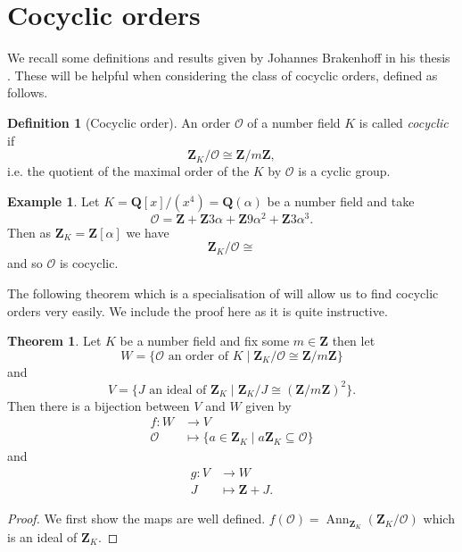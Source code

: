 \documentclass[a4paper,abstracton,bibtotoc]{scrreprt}
\theoremstyle{definition}
\newtheorem{thm}{Theorem}
\newtheorem{defn}{Definition}
\newtheorem{ex}{Example}
\newcommand{\QQ}{\mathbf{Q}}
\newcommand{\ZZ}{\mathbf{Z}}
\renewcommand{\O}{\mathcal{O}}
\DeclareMathOperator{\Ann}{Ann}
\begin{document}



\section{Cocyclic orders}
\label{sec:cocyc}
We recall some definitions and results given by Johannes Brakenhoff in his thesis \cite{brakenhoff}.
These will be helpful when considering the class of cocyclic orders, defined as follows.

\begin{defn}[Cocyclic order]
An order $\O$ of a number field $K$ is called \emph{cocyclic} if
\[
\ZZ_K/\O \cong \ZZ/m\ZZ,
\]
i.e. the quotient of the maximal order of the $K$ by $\O$ is a cyclic group.
\end{defn}

\begin{ex}
\label{ex:cocyc}
Let $K = \QQ[x]/(x^4 ) = \QQ(\alpha)$ be a number field and take %
\[
\O = \ZZ + \ZZ3\alpha + \ZZ9\alpha^2 + \ZZ3\alpha^3.
\]
Then as $\ZZ_K = \ZZ[\alpha]$ we have
\[
\ZZ_K/\O \cong 
\]
and so $\O$ is cocyclic.
\end{ex}

The following theorem which is a specialisation of \cite[Thm. 4.1]{brakenhoff} will allow us to find cocyclic orders very easily.
We include the proof here as it is quite instructive. %

\begin{thm}
\label{thm:coresp}
Let $K$ be a number field and fix some $m\in\ZZ$ then let
\[
W = \{\O \text{ an order of } K\mid \ZZ_K/\O \cong \ZZ/m\ZZ\}
\]
and
\[
V = \{ J \text{ an ideal of }\ZZ_K \mid \ZZ_K/J \cong (\ZZ/m\ZZ)^2 \}.
\]
Then there is a bijection between $V$ and $W$ given by
\begin{align*}
f\colon W &\to V\\
\O &\mapsto \{a\in\ZZ_K \mid a\ZZ_K \subseteq \O \}
\end{align*}
and
\begin{align*}
g\colon V&\to W\\
J&\mapsto \ZZ + J.
\end{align*}
\end{thm}

\begin{proof}\cite[Thm. 4.1, pp. 35]{brakenhoff} %
We first show the maps are well defined.
$f(\O) = \Ann_{\ZZ_K}(\ZZ_K/\O)$ which is an ideal of $\ZZ_K$.

\end{proof}
\end{document}
